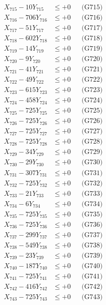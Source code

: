 \documentclass[a4paper,10pt]{article}
\begin{document}
{\begin{align}
X_{715} - 10Y_{715} &\leq +0 && \text{(G715)} \\
X_{716} - 706Y_{716} &\leq +0 && \text{(G716)} \\
X_{717} - 51Y_{717} &\leq +0 && \text{(G717)} \\
X_{718} - 602Y_{718} &\leq +0 && \text{(G718)} \\
X_{719} - 14Y_{719} &\leq +0 && \text{(G719)} \\
X_{720} - 9Y_{720} &\leq +0 && \text{(G720)} \\
\allowbreak
X_{721} - 41Y_{721} &\leq +0 && \text{(G721)} \\
X_{722} - 49Y_{722} &\leq +0 && \text{(G722)} \\
X_{723} - 615Y_{723} &\leq +0 && \text{(G723)} \\
X_{724} - 458Y_{724} &\leq +0 && \text{(G724)} \\
X_{725} - 725Y_{725} &\leq +0 && \text{(G725)} \\
X_{726} - 725Y_{726} &\leq +0 && \text{(G726)} \\
X_{727} - 725Y_{727} &\leq +0 && \text{(G727)} \\
X_{728} - 725Y_{728} &\leq +0 && \text{(G728)} \\
X_{729} - 34Y_{729} &\leq +0 && \text{(G729)} \\
X_{730} - 29Y_{730} &\leq +0 && \text{(G730)} \\
\allowbreak
X_{731} - 307Y_{731} &\leq +0 && \text{(G731)} \\
X_{732} - 725Y_{732} &\leq +0 && \text{(G732)} \\
X_{733} - 21Y_{733} &\leq +0 && \text{(G733)} \\
X_{734} - 6Y_{734} &\leq +0 && \text{(G734)} \\
X_{735} - 725Y_{735} &\leq +0 && \text{(G735)} \\
X_{736} - 725Y_{736} &\leq +0 && \text{(G736)} \\
X_{737} - 299Y_{737} &\leq +0 && \text{(G737)} \\
X_{738} - 549Y_{738} &\leq +0 && \text{(G738)} \\
X_{739} - 23Y_{739} &\leq +0 && \text{(G739)} \\
X_{740} - 187Y_{740} &\leq +0 && \text{(G740)} \\
\allowbreak
X_{741} - 725Y_{741} &\leq +0 && \text{(G741)} \\
X_{742} - 416Y_{742} &\leq +0 && \text{(G742)} \\
X_{743} - 725Y_{743} &\leq +0 && \text{(G743)} \\

\end{align}}
\end{document}
